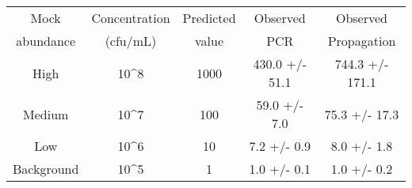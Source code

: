 \documentclass[12pt]{amsart}
\begin{document}
\begin{tabular} {c c c c c} \toprule
 Mock & Concentration & Predicted & Observed & Observed \\ 
 abundance & (cfu/mL) & value & PCR & Propagation \\
 \midrule 
 High & 10^8 & 1000 & 430.0 +/- 51.1 & 744.3 +/- 171.1 \\ 
 Medium & 10^7 & 100 & 59.0 +/- 7.0 & 75.3 +/- 17.3 \\
 Low & 10^6 & 10 & 7.2 +/- 0.9 & 8.0 +/- 1.8 \\
 Background & 10^5 & 1 & 1.0 +/- 0.1 & 1.0 +/- 0.2 \\
\bottomrule
\end{tabular}
\end{document}
